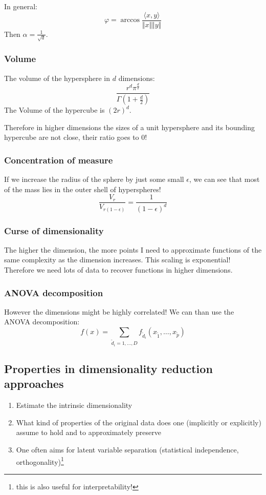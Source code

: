 In general: 
\[\varphi=\arccos\frac{\langle x,y\rangle}{\Vert x\Vert\Vert y\Vert}\]
Then $\alpha=\frac{1}{\sqrt{d}}$.

\subsubsection*{Volume}

The volume of the hypersphere in $d$ dimensions:
\[\frac{r^d\pi^{\frac{d}{2}}}{\Gamma(1+\frac{d}{2})}\]
The Volume of the hypercube is $(2r)^d$.

Therefore in higher dimensions the sizes of a unit hypersphere and its bounding hypercube are not close, their ratio goes to $0$!
\subsubsection*{Concentration of measure}
If we increase the radius of the sphere by just some small $\epsilon$, we can see that most of the mass 
lies in the outer shell of hyperspheres!
\[\frac{V_{r} }{V_{r(1-\epsilon)}}=\frac{1}{(1-\epsilon)^d}\]
\subsubsection*{Curse of dimensionality}
The higher the dimension, the more points I need to approximate functions of the same complexity as the dimension increases. This scaling is exponential!
Therefore we need lots of data to recover functions in higher dimensions.
\subsubsection*{ANOVA decomposition}
However the dimensions might be highly correlated! We can than use the ANOVA decomposition:
\[f(x)=\sum_{\tilde{d}_i={1,\dots,D}} f_{\tilde{d}_i}(x_{\tilde{1}},\dots,x_{\tilde{p}})\]

\subsection{Properties in dimensionality reduction approaches}

\begin{enumerate}
    \item Estimate the intrinsic dimensionality
    \item What kind of properties of the original data does one (implicitly or explicitly) assume to hold and to approximately preserve
    \item One often aims for latent variable separation (statistical independence, orthogonality)\footnote{this is also useful for interpretability!}
\end{enumerate}

